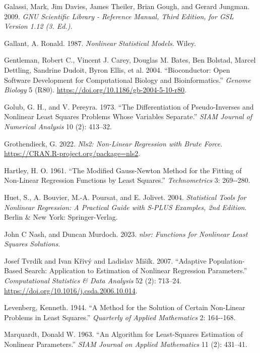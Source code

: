 \begin{CSLReferences}
Galassi, Mark, Jim Davies, James Theiler, Brian Gough, and Gerard Jungman. 2009. \emph{GNU Scientific Library - Reference Manual, Third Edition, for GSL Version 1.12 (3. Ed.).}

Gallant, A. Ronald. 1987. \emph{Nonlinear Statistical Models}. Wiley.

Gentleman, Robert C., Vincent J. Carey, Douglas M. Bates, Ben Bolstad, Marcel Dettling, Sandrine Dudoit, Byron Ellis, et al. 2004. {``Bioconductor: Open Software Development for Computational Biology and Bioinformatics.''} \emph{{Genome Biology}} 5 (R80). \url{https://doi.org/10.1186/gb-2004-5-10-r80}.

Golub, G. H., and V. Pereyra. 1973. {``The Differentiation of Pseudo-Inverses and Nonlinear Least Squares Problems Whose Variables Separate.''} \emph{SIAM Journal of Numerical Analysis} 10 (2): 413--32.

Grothendieck, G. 2022. \emph{Nls2: Non-Linear Regression with Brute Force}. \url{https://CRAN.R-project.org/package=nls2}.

Hartley, H. O. 1961. {``The Modified Gauss-Newton Method for the Fitting of Non-Linear Regression Functions by Least Squares.''} \emph{Technometrics} 3: 269-\/-280.

Huet, S., A. Bouvier, M.-A. Poursat, and E. Jolivet. 2004. \emph{Statistical Tools for Nonlinear Regression: A Practical Guide with {S-PLUS} Examples, 2nd Edition}. Berlin \& New York: Springer-Verlag.

John C Nash, and Duncan Murdoch. 2023. \emph{{nlsr: Functions for Nonlinear Least Squares Solutions}}.

Josef Tvrdík and Ivan Křivý and Ladislav Mišík. 2007. {``Adaptive Population-Based Search: Application to Estimation of Nonlinear Regression Parameters.''} \emph{{Computational Statistics \& Data Analysis}} 52 (2): 713--24. \url{https://doi.org/10.1016/j.csda.2006.10.014}.

Levenberg, Kenneth. 1944. {``A Method for the Solution of Certain Non-Linear Problems in Least Squares.''} \emph{Quarterly of Applied Mathematics} 2: 164-\/-168.

Marquardt, Donald W. 1963. {``{An Algorithm for Least-Squares Estimation of Nonlinear Parameters}.''} \emph{SIAM Journal on Applied Mathematics} 11 (2): 431--41.


\end{CSLReferences}
